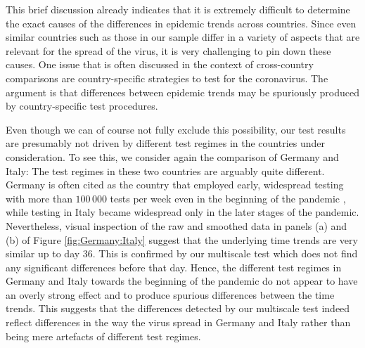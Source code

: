 \documentclass[a4paper,12pt]{article}
\numberwithin{equation}{section}
\begin{document}
This brief discussion already indicates that it is extremely difficult to determine the exact causes of the differences in epidemic trends across countries. Since even similar countries such as those in our sample differ in a variety of aspects that are relevant for the spread of the virus, it is very challenging to pin down these causes. One issue that is often discussed in the context of cross-country comparisons are country-specific strategies to test for the coronavirus. The argument is that differences between epidemic trends may be spuriously produced by country-specific test procedures.


Even though we can of course not fully exclude this possibility, our test results are presumably not driven by different test regimes in the countries under consideration. To see this, we consider again the comparison of Germany and Italy: The test regimes in these two countries are arguably quite different. Germany is often cited as the country that employed early, widespread testing with more than $100\,000$ tests per week even in the beginning of the pandemic \citep{Cohen2020}, while testing in Italy became widespread only in the {\color{red} later} stages of the pandemic. 
Nevertheless, visual inspection of the raw and smoothed data in panels (a) and (b) of Figure \ref{fig:Germany:Italy} suggest that the underlying time trends are very similar up to day $36$. This is confirmed by our multiscale test which does not find any significant differences before that day. Hence, the different test regimes in Germany and Italy towards the beginning of the pandemic do not appear to have an overly strong effect and to produce spurious differences between the time trends. This suggests that the differences detected by our multiscale test indeed reflect differences in the way the virus spread in Germany and Italy rather than being mere artefacts of different test regimes. 
\end{document}
